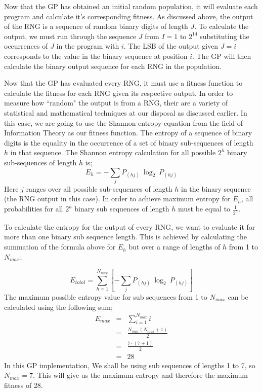\documentclass[a4paper,10.5pt]{article}
\begin{document}
Now that the GP has obtained an initial random population, it will evaluate each program and calculate it's corresponding fitness. As discussed above, the output of the RNG is a sequence of random binary digits of length $J$. To calculate the output, we must run through the sequence $J$ from $I = 1$ to $2^{14}$ substituting the occurrences of $J$ in the program with $i$. The LSB of the output given $J = i$ corresponds to the value in the binary sequence at position $i$. The GP will then calculate the binary output sequence for each RNG in the population. 

Now that the GP has evaluated every RNG, it must use a fitness function to calculate the fitness for each RNG given its respective output. In order to measure how ``random" the output is from a RNG, their are a variety of statistical and mathematical techniques at our disposal as discussed earlier. In this case, we are going to use the Shannon entropy equation from the field of Information Theory as our fitness function. The entropy of a sequence of binary digits is the equality in the occurrence of a set of binary sub-sequences of length $h$ in that sequence. The Shannon entropy calculation for all possible $2^h$ binary sub-sequences of length $h$ is;
\begin{equation*}
E_{h} = - \sum_{j} P_{(hj)}\ \log_2\ P_{(hj)}
\end{equation*}
Here $j$ ranges over all possible sub-sequences of length $h$ in the binary sequence (the RNG output in this case). In order to achieve maximum entropy for $E_h$, all probabilities for all $2^h$ binary sub sequences of length $h$ must be equal to $\frac{1}{2^h}$.

To calculate the entropy for the output of every RNG, we want to evaluate it for more than one binary sub sequence length. This is achieved by calculating the summation of the formula above for $E_h$ but over a range of lengths of $h$ from 1 to $N_{max}$; 

\begin{equation*}
E_{total} = \sum_{h = 1}^{N_{max}} \left[ - \sum_{j} P_{(hj)}\ \log_2\ P_{(hj)} \right]
\end{equation*}
The maximum possible entropy value for sub sequences from 1 to $N_{max}$ can be calculated using the following sum;
\begin{eqnarray*}
E_{max} &=& \sum_{i = 1}^{N_{max}} i
\\ &=& \frac{N_{max}(N_{max} + 1)}{2}
\\ &=& \frac{7 \cdot (7 + 1)}{2}
\\ &=& 28
\end{eqnarray*}
In this GP implementation, We shall be using sub sequences of lengths 1 to 7, so $N_{max} = 7$. This will give us the maximum entropy and therefore the maximum fitness of 28.
\end{document}
